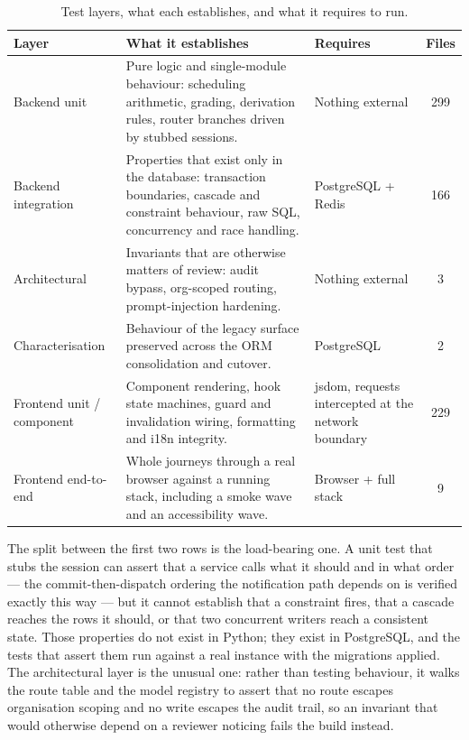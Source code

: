 \begin{table}[H]
\centering
\caption{Test layers, what each establishes, and what it requires to run.}
\label{tab:test_layers}
\renewcommand{\arraystretch}{1.35}
\begin{tabular}{|>{\raggedright\arraybackslash}m{}|>{\raggedright\arraybackslash}m{}|>{\raggedright\arraybackslash}m{}|c|}
\hline
\textbf{Layer} & \textbf{What it establishes} & \textbf{Requires} & \textbf{Files} \\ \hline
Backend unit & Pure logic and single-module behaviour: scheduling arithmetic, grading, derivation rules, router branches driven by stubbed sessions. & Nothing external & 299 \\ \hline
Backend integration & Properties that exist only in the database: transaction boundaries, cascade and constraint behaviour, raw SQL, concurrency and race handling. & PostgreSQL + Redis & 166 \\ \hline
Architectural & Invariants that are otherwise matters of review: audit bypass, org-scoped routing, prompt-injection hardening. & Nothing external & 3 \\ \hline
Characterisation & Behaviour of the legacy surface preserved across the ORM consolidation and cutover. & PostgreSQL & 2 \\ \hline
Frontend unit / component & Component rendering, hook state machines, guard and invalidation wiring, formatting and i18n integrity. & jsdom, requests intercepted at the network boundary & 229 \\ \hline
Frontend end-to-end & Whole journeys through a real browser against a running stack, including a smoke wave and an accessibility wave. & Browser + full stack & 9 \\ \hline
\end{tabular}
\end{table}

The split between the first two rows is the load-bearing one. A unit test that
stubs the session can assert that a service calls what it should and in what
order --- the commit-then-dispatch ordering the notification path depends on is
verified exactly this way --- but it cannot establish that a constraint fires,
that a cascade reaches the rows it should, or that two concurrent writers reach
a consistent state. Those properties do not exist in Python; they exist in
PostgreSQL, and the tests that assert them run against a real instance with the
migrations applied. The architectural layer is the unusual one: rather than
testing behaviour, it walks the route table and the model registry to assert
that no route escapes organisation scoping and no write escapes the audit
trail, so an invariant that would otherwise depend on a reviewer noticing fails
the build instead.

